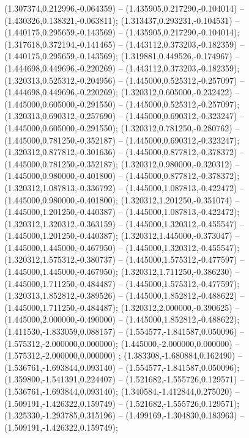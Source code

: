  (1.307374,0.212996,-0.064359) -- (1.435905,0.217290,-0.104014) -- (1.430326,0.138321,-0.063811);
 (1.313437,0.293231,-0.104531) -- (1.440175,0.295659,-0.143569) -- (1.435905,0.217290,-0.104014);
 (1.317618,0.372194,-0.141465) -- (1.443112,0.373203,-0.182359) -- (1.440175,0.295659,-0.143569);
 (1.319881,0.449526,-0.174967) -- (1.444698,0.449696,-0.220269) -- (1.443112,0.373203,-0.182359);
 (1.320313,0.525312,-0.204956) -- (1.445000,0.525312,-0.257097) -- (1.444698,0.449696,-0.220269);
 (1.320312,0.605000,-0.232422) -- (1.445000,0.605000,-0.291550) -- (1.445000,0.525312,-0.257097);
 (1.320313,0.690312,-0.257690) -- (1.445000,0.690312,-0.323247) -- (1.445000,0.605000,-0.291550);
 (1.320312,0.781250,-0.280762) -- (1.445000,0.781250,-0.352187) -- (1.445000,0.690312,-0.323247);
 (1.320312,0.877812,-0.301636) -- (1.445000,0.877812,-0.378372) -- (1.445000,0.781250,-0.352187);
 (1.320312,0.980000,-0.320312) -- (1.445000,0.980000,-0.401800) -- (1.445000,0.877812,-0.378372);
 (1.320312,1.087813,-0.336792) -- (1.445000,1.087813,-0.422472) -- (1.445000,0.980000,-0.401800);
 (1.320312,1.201250,-0.351074) -- (1.445000,1.201250,-0.440387) -- (1.445000,1.087813,-0.422472);
 (1.320312,1.320312,-0.363159) -- (1.445000,1.320312,-0.455547) -- (1.445000,1.201250,-0.440387);
 (1.320312,1.445000,-0.373047) -- (1.445000,1.445000,-0.467950) -- (1.445000,1.320312,-0.455547);
 (1.320312,1.575312,-0.380737) -- (1.445000,1.575312,-0.477597) -- (1.445000,1.445000,-0.467950);
 (1.320312,1.711250,-0.386230) -- (1.445000,1.711250,-0.484487) -- (1.445000,1.575312,-0.477597);
 (1.320313,1.852812,-0.389526) -- (1.445000,1.852812,-0.488622) -- (1.445000,1.711250,-0.484487);
 (1.320312,2.000000,-0.390625) -- (1.445000,2.000000,-0.490000) -- (1.445000,1.852812,-0.488622);
 (1.411530,-1.833059,0.088157) -- (1.554577,-1.841587,0.050096) -- (1.575312,-2.000000,0.000000);
 (1.445000,-2.000000,0.000000) -- (1.575312,-2.000000,0.000000) ;
 (1.383308,-1.680884,0.162490) -- (1.536761,-1.693844,0.093140) -- (1.554577,-1.841587,0.050096);
 (1.359800,-1.541391,0.224407) -- (1.521682,-1.555726,0.129571) -- (1.536761,-1.693844,0.093140);
 (1.340584,-1.412844,0.275020) -- (1.509191,-1.426322,0.159749) -- (1.521682,-1.555726,0.129571);
 (1.325330,-1.293785,0.315196) -- (1.499169,-1.304830,0.183963) -- (1.509191,-1.426322,0.159749);
